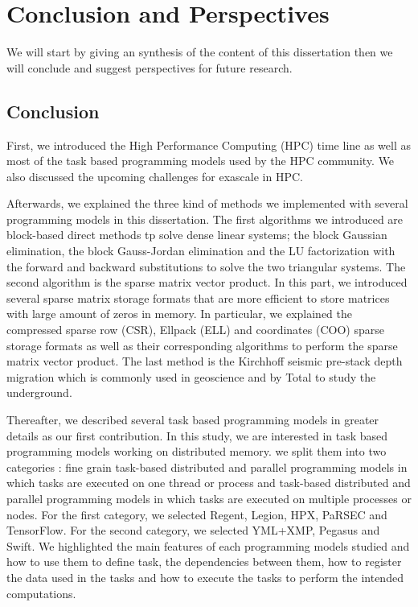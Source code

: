 \chapter{Conclusion and Perspectives \label{chap:ccl}}

We will start by giving an synthesis of the content of this dissertation then we will conclude and suggest perspectives for future research.

\section{Conclusion}

First, we introduced the High Performance Computing (HPC) time line as well as most of the task based programming models used by the HPC community.
We also discussed the upcoming challenges for exascale in HPC.

Afterwards, we explained the three kind of methods we implemented with several programming models in this dissertation.
The first algorithms we introduced are block-based direct methods tp solve dense linear systems; the block Gaussian elimination, the block Gauss-Jordan elimination and the LU factorization with the forward and backward substitutions to solve the two triangular systems.
The second algorithm is the sparse matrix vector product.
In this part, we introduced several sparse matrix storage formats that are more efficient to store matrices with large amount of zeros in memory.
In particular, we explained the compressed sparse row (CSR), Ellpack (ELL) and coordinates (COO) sparse storage formats as well as their corresponding algorithms to perform the sparse matrix vector product.
The last method is the Kirchhoff seismic pre-stack depth migration which is commonly used in geoscience and by Total to study the underground.

Thereafter, we described several task based programming models in greater details as our first contribution.
In this study, we are interested in task based programming models working on distributed memory.
we split them into two categories : fine grain task-based distributed and parallel programming models in which tasks are executed on one thread or process and task-based distributed and parallel programming models in which tasks are executed on multiple processes or nodes.
For the first category, we selected Regent, Legion, HPX, PaRSEC and TensorFlow.
For the second category, we selected YML+XMP, Pegasus and Swift.
We highlighted the main features of each programming models studied and how to use them to define task, the dependencies between them, how to register the data used in the tasks and how to execute the tasks to perform the intended computations.

